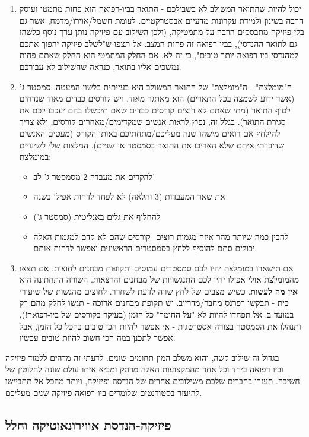 \documentclass[a4paper,12pt]{article}
\begin{document}
\begin{enumerate}
    \item יכול להיות שהתואר המשולב לא בשבילכם - 
התואר בביו-רפואה הוא פחות מתמטי ועוסק הרבה בשינון ולמידת עקרונות מדעיים אבסטרקטיים. לעומת חשמל/אוירו/מדמח, אשר גם בלי פיזיקה מתבססים הרבה על מתמטיקה, (ולכן השילוב עם פיזיקה נותן ערך נוסף כלשהו גם לתואר ההנדסי), בביו-רפואה זה פחות המצב. אל תצפו ש"לשלב פיזיקה יהפוך אתכם למהנדסי ביו-רפואה יותר טובים", כי זה לא. אם החלק המתמטי הוא החלק שאתם פחות נמשכים אליו בתואר, כנראה שהשילוב לא עבורכם.
    \item ה"מומלצת" -
    ה"מומלצת" של התואר המשולב היא בעייתית בלשון המעטה. סמסטר ג' (אשר ידוע לשמצה בכל התארים) הוא מאתגר מאוד, ויש קורסים כבדים מאוד שנדחים לסוף התואר (מתי שאתם לא רוצים קורסים כבדים שאם תיכשלו בהם יעכבו לכם את סגירת התואר). בגלל זה, נפוץ לראות אנשים שמקדימים/מאחרים קורסים, ולא צריך להילחץ אם רואים מישהו שנה מעליכם/מתחתיכם באותו הקורס (מעטים האנשים שדיברתי איתם שלא האריכו את התואר בסמסטר או שניים). המלצות שלי לשינויים במומלצת:
    \begin{itemize}
        \item להקדים את מעבדה 2 מסמסטר ג' לב'
        \item את שאר המעבדות (3 והלאה) לא לפחד לדחות אפילו בשנה
        \item להחליף את גלים באנליטית (סמסטר ג')
        \item להבין כמה שיותר מהר איזה מגמות רוצים- קורסים שהם לא קדם למגמות האלה יכולים סתם להוסיף ללחץ בסמסטרים הראשונים ואפשר לדחות אותם.
    \end{itemize}
    \item אם תישארו במומלצת יהיו לכם סמסטרים עמוסים ותקופות מבחנים לחוצות. אם תצאו מהמומלצת אולי אפילו יהיו לכם התנגשויות של מבחנים והרצאות. השורה התחתונה היא \textbf{אין מה לעשות}. כשיש מצבים של לחץ שווה לדעת לשחרר. לחוצים מהגשות של שיעורי בית - תבקשו רפרנס מחבר/מדרייב. יש תקופת מבחנים ארוכה - תגשו לחלק מהם רק במועד ב. אל תפחדו להיות לא "על החומר" כל הזמן (בעיקר בקורסים של ביו-רפואה!), ותנהלו את הסמסטר בצורה אסטרטגית - אי אפשר להיות הכי טובים בהכל כל הזמן, אבל אפשר לתכנן במה הכי חשוב להיות טובים עכשיו.
\end{enumerate}

בגדול זה שילוב קשה, והוא משלב המון תחומים שונים. לדעתי זה מדהים ללמוד פיזיקה וביו-רפואה ביחד וכל אחד מהמקצועות האלה מרתק ומביא איתו עולם שונה לחלוטין של חשיבה. תעזרו בחברים שלכם משילובים אחרים של הנדסה ופיזיקה, ויותר מהכל אל תתביישו להיעזר בסטודנטים שלומדים ביו-רפואה פיזיקה שנים מעליכם.

\subsection{פיזיקה-הנדסת אווירונאוטיקה וחלל}
\end{document}

